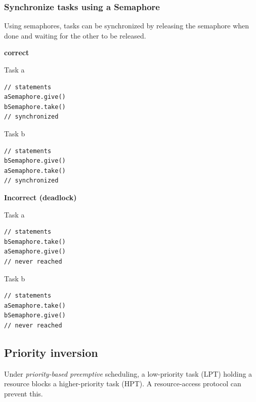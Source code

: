 \subsubsection{Synchronize tasks using a Semaphore}

Using semaphores, tasks can be synchronized by releasing the semaphore when done and waiting for the other to be released.

\begin{minipage}{0.49\columnwidth}
\textbf{correct}

\begin{minipage}{0.49\columnwidth}
Task a
\begin{lstlisting}
// statements
aSemaphore.give()
bSemaphore.take()
// synchronized 
\end{lstlisting}
\end{minipage}
\begin{minipage}{0.49\columnwidth}
Task b
\begin{lstlisting}
// statements
bSemaphore.give()
aSemaphore.take()
// synchronized
\end{lstlisting}
\end{minipage}
\end{minipage}
\begin{minipage}{0.49\columnwidth}
\textbf{Incorrect (deadlock)}

\begin{minipage}{0.49\columnwidth}
Task a
\begin{lstlisting}
// statements
bSemaphore.take()
aSemaphore.give()
// never reached
\end{lstlisting}
\end{minipage}
\begin{minipage}{0.49\columnwidth}
Task b
\begin{lstlisting}
// statements
aSemaphore.take()
bSemaphore.give()
// never reached
\end{lstlisting}
\end{minipage}
\end{minipage}

\subsection{Priority inversion}
Under \emph{priority-based preemptive} scheduling, a low-priority task (LPT) holding a resource blocks a higher-priority task (HPT).
A resource-access protocol can prevent this.
